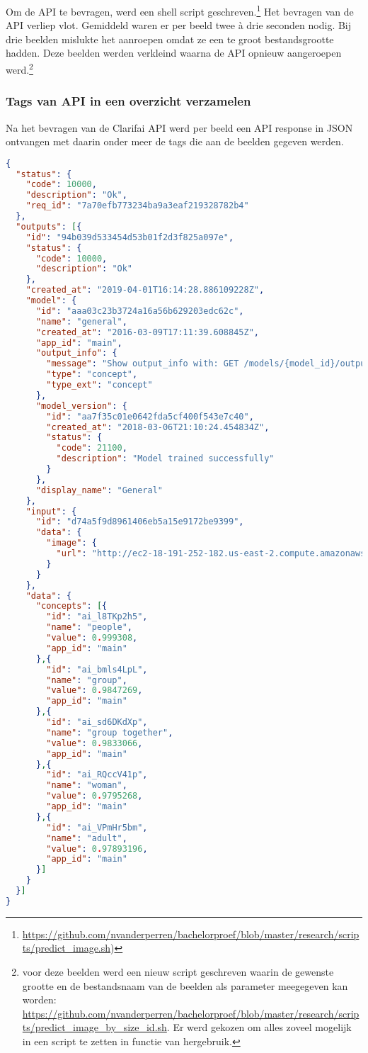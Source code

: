 Om de API te bevragen, werd een shell script geschreven.\footnote{\url{https://github.com/nvanderperren/bachelorproef/blob/master/research/scripts/predict_image.sh})} Het bevragen van de API verliep vlot. Gemiddeld waren er per beeld twee à drie seconden nodig. Bij drie beelden mislukte het aanroepen omdat ze een te groot bestandsgrootte hadden. Deze beelden werden verkleind waarna de API opnieuw aangeroepen werd.\footnote{voor deze beelden werd een nieuw script geschreven waarin de gewenste grootte en de bestandsnaam van de beelden als parameter meegegeven kan worden: \url{https://github.com/nvanderperren/bachelorproef/blob/master/research/scripts/predict_image_by_size_id.sh}. Er werd gekozen om alles zoveel mogelijk in een script te zetten in functie van hergebruik.}

\subsubsection{Tags van API in een overzicht verzamelen}

Na het bevragen van de Clarifai API werd per beeld een API response in JSON ontvangen met daarin onder meer de tags die aan de beelden gegeven werden.

\begin{lstlisting}[language=json,caption=een ingekorte versie van een ontvangen API response met voorspellingen van Clarifai .]
{
  "status": {
    "code": 10000,
    "description": "Ok",
    "req_id": "7a70efb773234ba9a3eaf219328782b4"
  },
  "outputs": [{
    "id": "94b039d533454d53b01f2d3f825a097e",
    "status": {
      "code": 10000,
      "description": "Ok"
    },
    "created_at": "2019-04-01T16:14:28.886109228Z",
    "model": {
      "id": "aaa03c23b3724a16a56b629203edc62c",
      "name": "general",
      "created_at": "2016-03-09T17:11:39.608845Z",
      "app_id": "main",
      "output_info": {
        "message": "Show output_info with: GET /models/{model_id}/output_info",
        "type": "concept",
        "type_ext": "concept"
      },
      "model_version": {
        "id": "aa7f35c01e0642fda5cf400f543e7c40",
        "created_at": "2018-03-06T21:10:24.454834Z",
        "status": {
       	  "code": 21100,
          "description": "Model trained successfully"
        }
      },
      "display_name": "General"
   	},
    "input": {
      "id": "d74a5f9d8961406eb5a15e9172be9399",
      "data": {
        "image": {
          "url": "http://ec2-18-191-252-182.us-east-2.compute.amazonaws.com:8182/iiif/2/FO-30-00197/full/full/0/default.jpg"
        }
      }
    },
    "data": {
      "concepts": [{
        "id": "ai_l8TKp2h5",
        "name": "people",
        "value": 0.999308,
        "app_id": "main"
      },{
        "id": "ai_bmls4LpL",
        "name": "group",
        "value": 0.9847269,
        "app_id": "main"
      },{
        "id": "ai_sd6DKdXp",
        "name": "group together",
        "value": 0.9833066,
        "app_id": "main"
      },{
        "id": "ai_RQccV41p",
        "name": "woman",
        "value": 0.9795268,
        "app_id": "main"
      },{
        "id": "ai_VPmHr5bm",
        "name": "adult",
        "value": 0.97893196,
        "app_id": "main"
      }]
    }
  }]
}
\end{lstlisting}

